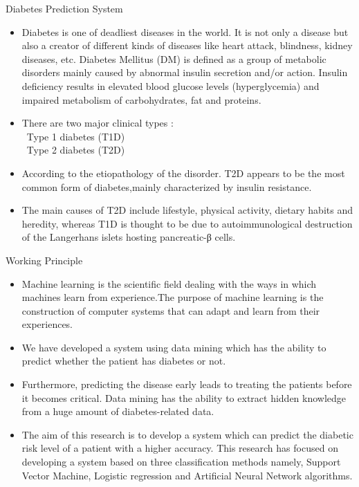 \documentclass{SKP-beamer}
\begin{document}
\begin{frame}{Diabetes Prediction System}
	\begin{itemize}
		\item Diabetes is one of deadliest diseases in the
		world. It is not only a disease but also a creator of
		different kinds of diseases like heart attack,
		blindness, kidney diseases, etc.
	    Diabetes Mellitus (DM) is defined as a group of metabolic
		disorders mainly caused by abnormal insulin
		secretion and/or action. Insulin deficiency results in
		elevated blood glucose levels (hyperglycemia) and
		impaired metabolism of carbohydrates, fat and
		proteins.
		\item There are two major clinical types : \\\ 
		Type 1 diabetes (T1D) \\\
		Type 2 diabetes (T2D) 
		\item According to the etiopathology
		of the disorder. T2D appears to be the most common
		form of diabetes,mainly characterized by insulin resistance. 
		\item The main
		causes of T2D include lifestyle, physical activity,
		dietary habits and heredity, whereas T1D is thought
		to be due to autoimmunological destruction of the
		Langerhans islets hosting pancreatic-β cells.
			
	\end{itemize}
\end{frame}

\begin{frame}{Working Principle}
	\begin{itemize}
	      \item Machine learning is the scientific field
	      dealing with the ways in which machines learn from
	      experience.The purpose of
	      machine learning is the construction of computer
	      systems that can adapt and learn from their experiences.
	      \item We have developed a system using data
	      mining which has the ability to predict whether the
	      patient has diabetes or not.
	      \item Furthermore, predicting
	      the disease early leads to treating the patients before
	      it becomes critical. Data mining has the ability to
	      extract hidden knowledge from a huge amount of
	      diabetes-related data.
	      \item The aim of this research is to develop a system
	      which can predict the diabetic risk level of a patient
	      with a higher accuracy. This research has focused on
	      developing a system based on three classification
	      methods namely, Support Vector Machine, Logistic
	      regression and Artificial Neural Network algorithms. 
	\end{itemize}
\end{frame}
\end{document}
